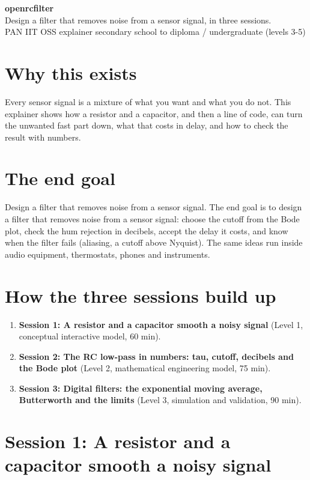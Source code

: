 \documentclass[11pt,a4paper]{article}
\begin{document}
\begin{center}{\LARGE\bfseries openrcfilter}\\[0.4em]{\large Design a filter that removes noise from a sensor signal, in three sessions.}\\[0.2em]\small PAN IIT OSS explainer \textbullet{} secondary school to diploma / undergraduate (levels 3-5)\end{center}

\section*{Why this exists}
Every sensor signal is a mixture of what you want and what you do not. This explainer shows how a resistor and a capacitor, and then a line of code, can turn the unwanted fast part down, what that costs in delay, and how to check the result with numbers.

\section*{The end goal}
Design a filter that removes noise from a sensor signal. The end goal is to design a filter that removes noise from a sensor signal: choose the cutoff from the Bode plot, check the hum rejection in decibels, accept the delay it costs, and know when the filter fails (aliasing, a cutoff above Nyquist). The same ideas run inside audio equipment, thermostats, phones and instruments.

\section*{How the three sessions build up}
\begin{enumerate}[nosep]
\item \textbf{Session 1: A resistor and a capacitor smooth a noisy signal} (Level 1, conceptual interactive model, 60 min).
\item \textbf{Session 2: The RC low-pass in numbers: tau, cutoff, decibels and the Bode plot} (Level 2, mathematical engineering model, 75 min).
\item \textbf{Session 3: Digital filters: the exponential moving average, Butterworth and the limits} (Level 3, simulation and validation, 90 min).
\end{enumerate}

\section{Session 1: A resistor and a capacitor smooth a noisy signal}
\end{document}
